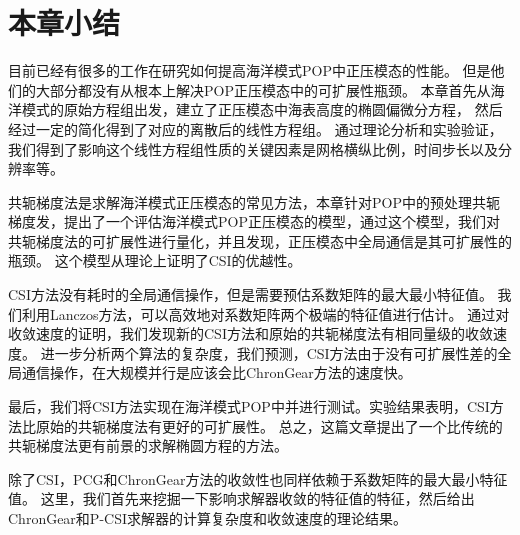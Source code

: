  

 

\section{本章小结}
\label{solver:Conclusion}

目前已经有很多的工作在研究如何提高海洋模式POP中正压模态的性能。 
但是他们的大部分都没有从根本上解决POP正压模态中的可扩展性瓶颈。 
本章首先从海洋模式的原始方程组出发，建立了正压模态中海表高度的椭圆偏微分方程，
然后经过一定的简化得到了对应的离散后的线性方程组。
通过理论分析和实验验证，我们得到了影响这个线性方程组性质的关键因素是网格横纵比例，时间步长以及分辨率等。

共轭梯度法是求解海洋模式正压模态的常见方法，本章针对POP中的预处理共轭梯度发，提出了一个评估海洋模式POP正压模态的模型，通过这个模型，我们对共轭梯度法的可扩展性进行量化，并且发现，正压模态中全局通信是其可扩展性的瓶颈。
这个模型从理论上证明了CSI的优越性。 

CSI方法没有耗时的全局通信操作，但是需要预估系数矩阵的最大最小特征值。
我们利用Lanczos方法，可以高效地对系数矩阵两个极端的特征值进行估计。
通过对收敛速度的证明，我们发现新的CSI方法和原始的共轭梯度法有相同量级的收敛速度。
进一步分析两个算法的复杂度，我们预测，CSI方法由于没有可扩展性差的全局通信操作，在大规模并行是应该会比ChronGear方法的速度快。

最后，我们将CSI方法实现在海洋模式POP中并进行测试。实验结果表明，CSI方法比原始的共轭梯度法有更好的可扩展性。 
总之，这篇文章提出了一个比传统的共轭梯度法更有前景的求解椭圆方程的方法。 

除了CSI，PCG和ChronGear方法的收敛性也同样依赖于系数矩阵的最大最小特征值。
这里，我们首先来挖掘一下影响求解器收敛的特征值的特征，然后给出ChronGear和P-CSI求解器的计算复杂度和收敛速度的理论结果。
